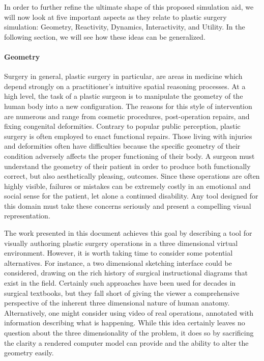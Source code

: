In order to further refine the ultimate shape of this proposed
simulation aid, we will now look at five important aspects as they
relate to plastic surgery simulation: Geometry, Reactivity, Dynamics,
Interactivity, and Utility. In the following section, we will see how
these ideas can be generalized.

\paragraph{Geometry} Surgery in general, plastic surgery in
particular, are areas in medicine which depend strongly on a
practitioner's intuitive spatial reasoning processes. At a high level,
the task of a plastic surgeon is to manipulate the geometry of the
human body into a new configuration. The reasons for this style of
intervention are numerous and range from cosmetic procedures,
post-operation repairs, and fixing congenital deformities. Contrary to
popular public perception, plastic surgery is often employed to enact
functional repairs. Those living with injuries and deformities often
have difficulties because the specific geometry of their condition
adversely affects the proper functioning of their body. A surgeon must
understand the geometry of their patient in order to produce both
functionally correct, but also aesthetically pleasing, outcomes. Since
these operations are often highly visible, failures or mistakes can be
extremely costly in an emotional and social sense for the patient, let
alone a continued disability. Any tool designed for this domain must
take these concerns seriously and present a compelling visual
representation.

The work presented in this document achieves this goal by describing a
tool for visually authoring plastic surgery operations in a three
dimensional virtual environment. However, it is worth taking time to consider
some potential alternatives. For instance, a two dimensional sketching
interface could be considered, drawing on the rich history of surgical
instructional diagrams that exist in the field. Certainly such
approaches have been used for decades in surgical textbooks, but they
fall short of giving the viewer a comprehensive perspective of the
inherent three dimensional nature of human anatomy. Alternatively, one
might consider using video of real operations, annotated with
information describing what is happening. While this idea certainly
leaves no question about the three dimensionality of the problem, it
does so by sacrificing the clarity a rendered computer model can
provide and the ability to alter the geometry easily.

